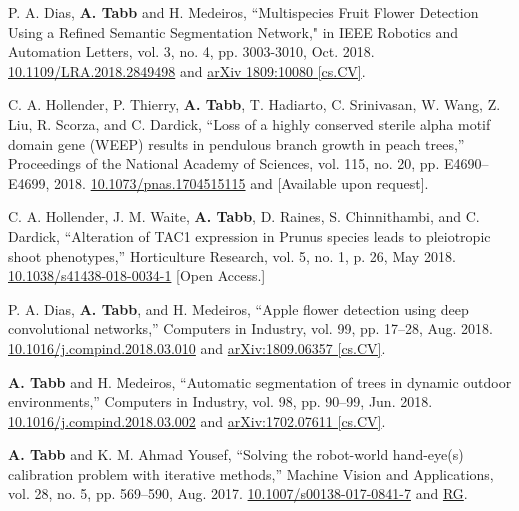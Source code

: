 \documentclass[letterpaper,11pt]{article}
\begin{document}
\begin{enumerate}[noitemsep, leftmargin=*,label={[\arabic*]}]
\item{P. A. Dias, \textbf{A. Tabb} and H. Medeiros, ``Multispecies Fruit Flower Detection Using a Refined Semantic Segmentation Network," in IEEE Robotics and Automation Letters, vol. 3, no. 4, pp. 3003-3010, Oct. 2018. \href{https://doi.org/10.1109/LRA.2018.2849498}{10.1109/LRA.2018.2849498} and \href{https://arxiv.org/abs/1809.10080}{arXiv 1809:10080 [cs.CV]}.}

\item{C. A. Hollender, P. Thierry, \textbf{A. Tabb}, T. Hadiarto, C. Srinivasan, W. Wang, Z. Liu, R. Scorza, and C. Dardick, ``Loss of a highly conserved sterile alpha motif domain gene (WEEP) results in pendulous branch growth in peach trees,” Proceedings of the National Academy of Sciences, vol. 115, no. 20, pp. E4690–E4699, 2018. \href{https://doi.org/10.1073/pnas.1704515115}{10.1073/pnas.1704515115} and [Available upon request].}

\item{C. A. Hollender, J. M. Waite, \textbf{A. Tabb}, D. Raines, S. Chinnithambi, and C. Dardick, ``Alteration of TAC1 expression in Prunus species leads to pleiotropic shoot phenotypes,” Horticulture Research, vol. 5, no. 1, p. 26, May 2018. \href{https://doi.org/10.1038/s41438-018-0034-1}{10.1038/s41438-018-0034-1} [Open Access.]}

\item{P. A. Dias, \textbf{A. Tabb}, and H. Medeiros, ``Apple flower detection using deep convolutional networks,” Computers in Industry, vol. 99, pp. 17–28, Aug. 2018. \href{https://doi.org/10.1016/j.compind.2018.03.010}{10.1016/j.compind.2018.03.010} and \href{https://arxiv.org/abs/1809.06357}{arXiv:1809.06357 [cs.CV]}.}

\item{\textbf{A. Tabb} and H. Medeiros, ``Automatic segmentation of trees in dynamic outdoor environments,” Computers in Industry, vol. 98, pp. 90–99, Jun. 2018. \href{https://doi.org/10.1016/j.compind.2018.03.002}{10.1016/j.compind.2018.03.002} and \href{https://arxiv.org/pdf/1702.07611.pdf}{arXiv:1702.07611 [cs.CV]}.}

\item{\textbf{A. Tabb} and K. M. Ahmad Yousef, “Solving the robot-world hand-eye(s) calibration problem with iterative methods,” Machine Vision and Applications, vol. 28, no. 5, pp. 569–590, Aug. 2017. \href{https://doi.org/10.1007/s00138-017-0841-7}{10.1007/s00138-017-0841-7} and \href{https://www.researchgate.net/publication/316625160_Solving_the_robot-world_hand-eyes_calibration_problem_with_iterative_methods}{RG}.}


\end{enumerate}
\end{document}
